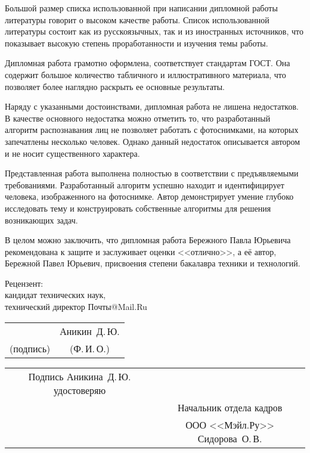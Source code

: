\documentclass[a4paper]{article}
\begin{document}
Большой размер списка использованной при написании дипломной работы 
литературы говорит о высоком качестве работы. Список использованной литературы 
состоит как из русскоязычных, так и из иностранных источников, что показывает 
высокую степень проработанности и изучения темы работы. 

Дипломная работа грамотно оформлена, соответствует стандартам ГОСТ. Она 
содержит большое количество табличного и иллюстративного материала, что 
позволяет более наглядно раскрыть ее основные результаты. 

Наряду с указанными достоинствами, дипломная работа не лишена недостатков. 
В качестве основного недостатка можно отметить то, что разработанный алгоритм распознавания
лиц не позволяет работать с фотоснимками, на которых запечатлены несколько человек.
Однако данный недостаток описывается автором и не носит существенного характера.

Представленная работа выполнена полностью в 
соответствии с предъявляемыми требованиями. Разработанный алгоритм успешно
находит и идентифицирует человека, изображенного на фотоснимке. Автор демонстрирует умение 
глубоко исследовать тему и конструировать собственные алгоритмы для решения 
возникающих задач.

В целом можно заключить, что дипломная работа Бережного Павла Юрьевича
рекомендована к защите и заслуживает оценки <<отлично>>, а её автор, Бережной Павел Юрьевич,
присвоения степени бакалавра техники и технологий.
\thispagestyle{empty}

\vspace{10cm}

\begin{flushleft}
    Рецензент:\\
    кандидат технических наук, \\
    технический директор Почты@Mail.Ru \\
    \begin{tabular}{cc}
        \underline{\hspace{4cm}} & Аникин~Д.\,Ю. \\
        (подпись) & (Ф.\,И.\,О.)
    \end{tabular}

    \vspace{2cm}
    \begin{tabular}{cc}
        Подпись Аникина~Д.\,Ю. удостоверяю & \underline{\hspace{7cm}} \\
                                           & Начальник отдела кадров \\
                                           & ООО <<Мэйл.Ру>> Сидорова~О.\,В.
\end{tabular}
\end{flushleft}
\end{document}
